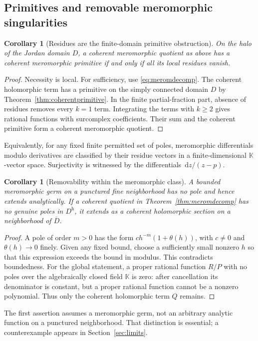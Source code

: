 \documentclass[11pt,a4paper]{article}
\newtheorem{corollary}[theorem]{Corollary}
\theoremstyle{definition}\newtheorem{definition}[theorem]{Definition}
\theoremstyle{remark}\newtheorem{remark}[theorem]{Remark}
\newcommand{\K}{\mathbb K}
\newcommand{\halo}[1]{#1^{\mathrm h}}
\newcommand{\dd}{\,\mathrm d}
\numberwithin{equation}{section}
\begin{document}
\subsection{Primitives and removable meromorphic singularities}
\begin{corollary}[Residues are the finite-domain primitive obstruction]\label{cor:resprimitive}
On the halo of the Jordan domain $D$, a coherent meromorphic quotient as above has a coherent meromorphic primitive if and only if all its local residues vanish.
\end{corollary}
\begin{proof}
Necessity is local. For sufficiency, use \eqref{eq:meromdecomp}. The coherent holomorphic term has a primitive on the simply connected domain $D$ by Theorem~\ref{thm:coherentprimitive}. In the finite partial-fraction part, absence of residues removes every $k=1$ term. Integrating the terms with $k\geq2$ gives rational functions with surcomplex coefficients. Their sum and the coherent primitive form a coherent meromorphic quotient.
\end{proof}
Equivalently, for any fixed finite permitted set of poles, meromorphic differentials modulo derivatives are classified by their residue vectors in a finite-dimensional $\K$-vector space. Surjectivity is witnessed by the differentials $\dd z/(z-p)$.

\begin{corollary}[Removability within the meromorphic class]\label{cor:removable}
A bounded meromorphic germ on a punctured fine neighborhood has no pole and hence extends analytically. If a coherent quotient in Theorem~\ref{thm:meromdecomp} has no genuine poles in $\halo D$, it extends as a coherent holomorphic section on a neighborhood of $\overline D$.
\end{corollary}
\begin{proof}
A pole of order $m>0$ has the form $c h^{-m}(1+\theta(h))$, with $c\ne0$ and $\theta(h)\to0$ finely. Given any fixed bound, choose a sufficiently small nonzero $h$ so that this expression exceeds the bound in modulus. This contradicts boundedness. For the global statement, a proper rational function $R/P$ with no poles over the algebraically closed field $\K$ is zero: after cancellation its denominator is constant, but a proper rational function cannot be a nonzero polynomial. Thus only the coherent holomorphic term $Q$ remains.
\end{proof}
The first assertion assumes a meromorphic germ, not an arbitrary analytic function on a punctured neighborhood. That distinction is essential; a counterexample appears in Section~\ref{sec:limits}.
\end{document}
